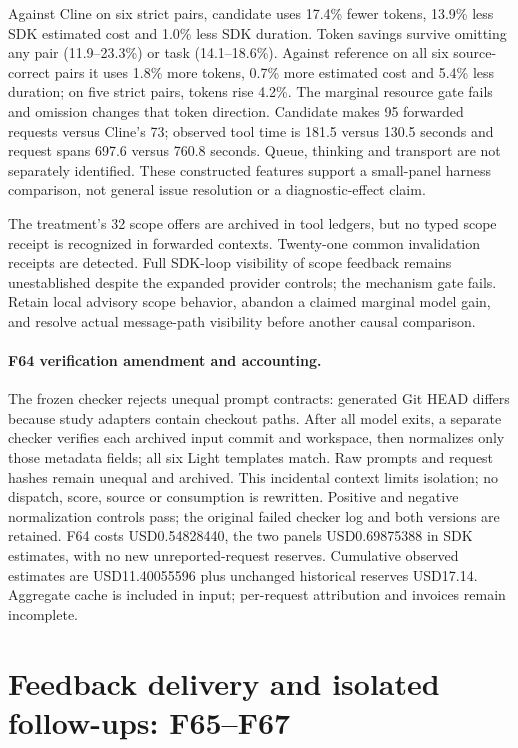 \documentclass[11pt,a4paper]{article}
\begin{document}
Against Cline on six strict pairs, candidate uses 17.4\% fewer tokens,
13.9\% less SDK estimated cost and 1.0\% less SDK duration. Token savings survive
omitting any pair (11.9--23.3\%) or task (14.1--18.6\%). Against reference on all
six source-correct pairs it uses 1.8\% more tokens, 0.7\% more estimated cost and
5.4\% less duration; on five strict pairs, tokens rise 4.2\%. The marginal resource
gate fails and omission changes that token direction. Candidate makes 95 forwarded
requests versus Cline's 73; observed tool time is 181.5 versus 130.5 seconds and
request spans 697.6 versus 760.8 seconds. Queue, thinking and transport are not
separately identified. These constructed features support a small-panel harness
comparison, not general issue resolution or a diagnostic-effect claim.

The treatment's 32 scope offers are archived in tool ledgers, but no typed scope
receipt is recognized in forwarded contexts. Twenty-one common invalidation
receipts are detected. Full SDK-loop visibility of scope feedback remains
unestablished despite the expanded provider controls; the mechanism gate fails.
Retain local advisory scope behavior, abandon a claimed marginal model gain, and
resolve actual message-path visibility before another causal comparison.

\paragraph{F64 verification amendment and accounting.}
The frozen checker rejects unequal prompt contracts: generated Git HEAD differs
because study adapters contain checkout paths. After all model exits, a separate
checker verifies each archived input commit and workspace, then normalizes only
those metadata fields; all six Light templates match. Raw prompts and request
hashes remain unequal and archived. This incidental context limits isolation;
no dispatch, score, source or consumption is rewritten. Positive and negative
normalization controls pass; the original failed checker log and both versions
are retained. F64 costs USD0.54828440, the two panels USD0.69875388 in SDK estimates,
with no new unreported-request reserves. Cumulative observed estimates are
USD11.40055596 plus unchanged historical reserves USD17.14. Aggregate cache is
included in input; per-request attribution and invoices remain incomplete.

\section{Feedback delivery and isolated follow-ups: F65--F67}
\end{document}
